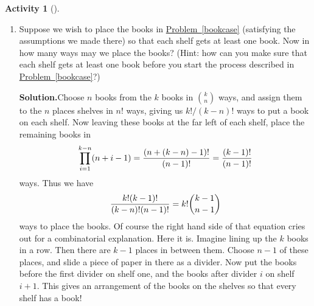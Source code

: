 \documentclass[10pt,]{book}
\theoremstyle{plain}
\theoremstyle{definition}
\newtheorem{activity}[project]{Activity}
\numberwithin{equation}{chapter}
\begin{document}
\begin{activity}[]
\begin{enumerate}[label=(\alph*)]
~\par
\item Suppose we wish to place the books in \hyperref[bookcase]{Problem~\ref{bookcase}} (satisfying the assumptions we made there) so that each shelf gets at least one book. Now in how many ways may we place the books? (Hint: how can you make sure that each shelf gets at least one book before you start the process described in \hyperref[bookcase]{Problem~\ref{bookcase}}?)%
\par\medskip\noindent%
\textbf{Solution.}\quad Choose \(n\) books from the \(k\) books in \(k\choose n\) ways, and assign them to the \(n\) places shelves in \(n!\) ways, giving us \(k!/(k-n)!\) ways to put a book on each shelf. Now leaving these books at the far left of each shelf, place the remaining books in%
\begin{equation*}
\prod_{i=1}^{k-n}
(n+i-1)={(n+(k-n)-1)!\over (n-1)!}={(k-1)!\over (n-1)!}
\end{equation*}
ways. Thus we have%
\begin{equation*}
{k!(k-1)!\over(k-n)!(n-1)!}=k!{k-1\choose n-1}
\end{equation*}
ways to place the books. Of course the right hand side of that equation cries out for a combinatorial explanation. Here it is. Imagine lining up the \(k\) books in a row. Then there are \(k-1\) places in between them. Choose \(n-1\) of these places, and slide a piece of paper in there as a divider. Now put the books before the first divider on shelf one, and the books after divider \(i\) on shelf \(i+1\). This gives an arrangement of the books on the shelves so that every shelf has a book!%

\end{enumerate}
\end{activity}
\end{document}

